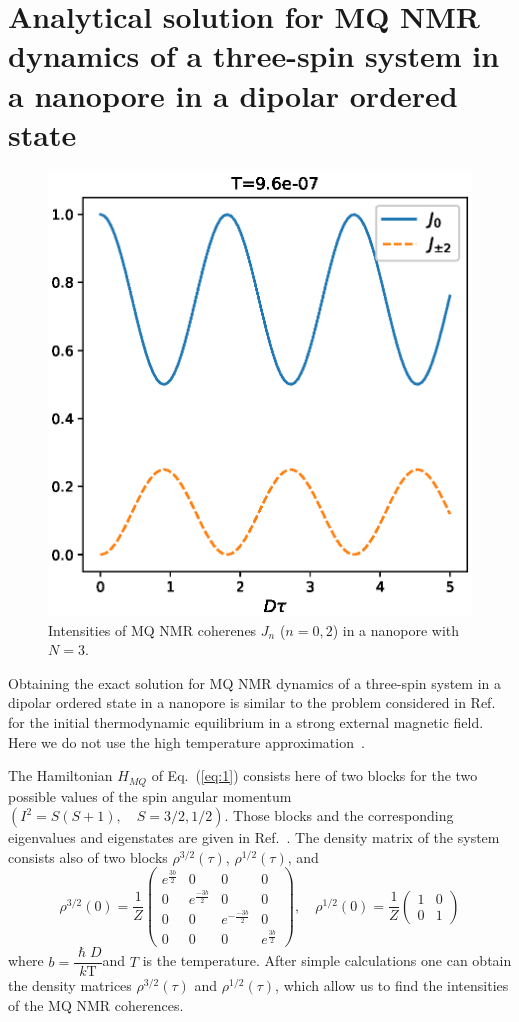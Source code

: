 \documentclass[review]{elsarticle}
\begin{document}
\section{Analytical solution for MQ NMR dynamics of a three-spin system in a nanopore in a dipolar ordered state}
\label{sec:3}

\begin{figure}
    \centering
  	\includegraphics[width=0.5\linewidth]{coherences_n3_beta5.eps}
	\caption{
	    Intensities of MQ NMR coherenes $J_{n}$ ($n=0, 2$) in a nanopore with $N=3$.
	}
	\label{fig:1}
\end{figure}

Obtaining the exact solution for MQ NMR dynamics of a three-spin system in a dipolar ordered state in a nanopore is similar to the problem considered in Ref.~\cite{Doronin_2019} for the initial thermodynamic equilibrium in a strong external magnetic field. 
Here we do not use the high temperature approximation~\cite{Goldman_1970}.

The Hamiltonian $H_{MQ}$ of Eq.~(\ref{eq:1}) consists here of two blocks for the two possible values of the spin angular momentum $(I^2 = S(S+1),  \quad S=3/2,1/2)$.
Those blocks and the corresponding eigenvalues and eigenstates are given in Ref.~\cite{Doronin_2019}.
The density matrix of the system consists also of two blocks $\rho^{3/2}(\tau)$, $\rho^{1/2}(\tau)$, and 
%
\begin{equation}
    \label{eq:15} 
    \rho^{3/2}(0) = \dfrac 1 Z
    \begin{pmatrix}
        e^{\frac{3b}{2}} & 0 & 0 & 0 
        \\
        0 & e^{\frac{-3b}{2}} & 0 & 0 
        \\
        0 & 0 & e^{-\frac{-3b}{2}} & 0 
        \\
        0 & 0 & 0 & e^{\frac{3b}{2}}
    \end{pmatrix}, 
    \quad
    \rho^{1/2}(0) = \dfrac 1 Z
    \begin{pmatrix}
       	1 & 0 
        \\
        0 & 1
    \end{pmatrix}
\end{equation}
%
where $b = \dfrac{\hslash D}{k\mathrm{T}}$and $T$ is the temperature.
After simple calculations one can obtain the density matrices $\rho^{3/2}(\tau)$ and $\rho^{1/2}(\tau)$, 
which allow us to find the intensities of the MQ NMR coherences.
\end{document}
